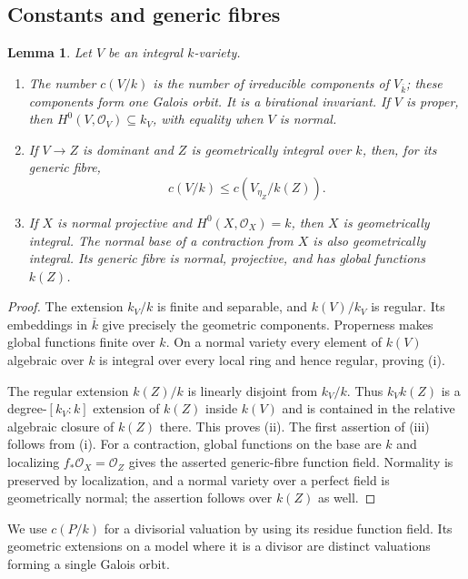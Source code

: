 \documentclass[11pt]{article}
\numberwithin{equation}{section}
\newtheorem{lemma}[theorem]{Lemma}
\theoremstyle{definition}
\newcommand{\kb}{\overline{k}}
\newcommand{\OO}{\mathcal O}
\newcommand{\cdeg}[2]{c(#1/#2)}
\begin{document}
\subsection{Constants and generic fibres}

\begin{lemma}\label{lem:constants}
Let $V$ be an integral $k$-variety.
\begin{enumerate}[label=\textup{(\roman*)}]
\item The number $\cdeg{V}{k}$ is the number of irreducible components of
$V_{\kb}$; these components form one Galois orbit. It is a birational
invariant. If $V$ is proper, then $H^0(V,\OO_V)\subseteq k_V$, with
equality when $V$ is normal.
\item If $V\to Z$ is dominant and $Z$ is geometrically integral over $k$,
then, for its generic fibre,
\begin{equation}\label{eq:generic-constants}
 \cdeg{V}{k}\leq\cdeg{V_{\eta_Z}}{k(Z)}.
\end{equation}
\item If $X$ is normal projective and $H^0(X,\OO_X)=k$, then $X$ is
geometrically integral. The normal base of a contraction from $X$ is
also geometrically integral. Its generic fibre is normal, projective,
and has global functions $k(Z)$.
\end{enumerate}
\end{lemma}

\begin{proof}
The extension $k_V/k$ is finite and separable, and $k(V)/k_V$ is regular.
Its embeddings in $\kb$ give precisely the geometric components. Properness
makes global functions finite over $k$. On a normal variety every element
of $k(V)$ algebraic over $k$ is integral over every local ring and hence
regular, proving (i).

The regular extension $k(Z)/k$ is linearly disjoint from $k_V/k$. Thus
$k_Vk(Z)$ is a degree-$[k_V:k]$ extension of $k(Z)$ inside $k(V)$ and is
contained in the relative algebraic closure of $k(Z)$ there. This proves
(ii). The first assertion of (iii) follows from (i). For a contraction,
global functions on the base are $k$ and localizing $f_*\OO_X=\OO_Z$
gives the asserted generic-fibre function field. Normality is preserved
by localization, and a normal variety over a perfect field is geometrically
normal; the assertion follows over $k(Z)$ as well.
\end{proof}
We use $\cdeg{P}{k}$ for a divisorial valuation by using its residue
function field. Its geometric extensions on a model where it is a divisor
are distinct valuations forming a single Galois orbit.
\end{document}
